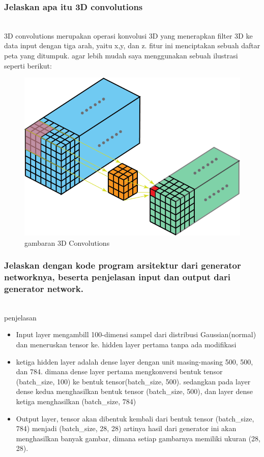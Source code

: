 \subsubsection{Jelaskan apa itu 3D convolutions}
\hfill\\
3D convolutions merupakan operasi konvolusi 3D yang menerapkan filter 3D ke data input dengan tiga arah, yaitu x,y, dan z. fitur ini menciptakan sebuah daftar peta yang ditumpuk. agar lebih mudah saya menggunakan sebuah ilustrasi seperti berikut:
\begin{figure}[H]
	\centering
	\includegraphics[scale=0.5]{figures/1174070/8/3dconvolutions.png}
	\caption{gambaran 3D Convolutions}
\end{figure}

\subsubsection{Jelaskan dengan kode program arsitektur dari generator networknya, beserta penjelasan input dan output dari generator network.}
\hfill\\

penjelasan
\begin{itemize}
	\item Input layer mengambill 100-dimensi sampel dari distribusi Gaussian(normal) dan meneruskan tensor ke. hidden layer pertama tanpa ada modifikasi
	\item ketiga hidden layer adalah dense layer dengan unit masing-masing 500, 500, dan 784. dimana dense layer pertama mengkonversi bentuk tensor (batch\_size, 100) ke bentuk tensor(batch\_size, 500). sedangkan pada layer dense kedua menghasilkan bentuk tensor (batch\_size, 500), dan layer dense ketiga menghasilkan (batch\_size, 784)
	\item Output layer, tensor akan dibentuk kembali dari bentuk tensor (batch\_size, 784) menjadi (batch\_size, 28, 28) artinya hasil dari generator ini akan menghasilkan banyak gambar, dimana setiap gambarnya memiliki ukuran (28, 28). 
\end{itemize}

